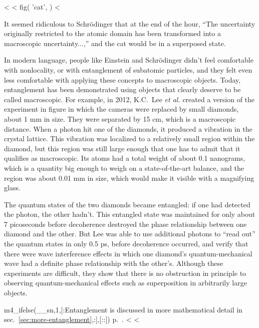 <%
<%
  fig(
    'cat',
  )
<%

\noindent It seemed ridiculous to Schr\"odinger that at the end of
the hour, ``The uncertainty originally restricted to the atomic domain
has been transformed into a macroscopic uncertainty...,'' and the cat
would be in a superposed state. 

In modern language, people like Einstein and Schr\"odinger didn't feel
comfortable with nonlocality, or with entanglement of subatomic
particles, and they felt even less comfortable with applying these
concepts to macroscopic objects. Today, entanglement has been
demonstrated using objects that clearly deserve to be called
macroscopic.\label{macroscopic-entanglement}
For example, in 2012, K.C.~Lee \emph{et al.} created a
version of the experiment in figure  in which
the cameras were replaced by small diamonds, about 1 mm in size.  They
were separated by 15 cm, which is a macroscopic distance. When a
photon hit one of the diamonds, it produced a vibration in the crystal
lattice.  This vibration was localized to a relatively small region
within the diamond, but this region was still large enough that one
has to admit that it qualifies as macroscopic. Its atoms had a total
weight of about 0.1 nanograms, which is a quantity big enough to weigh
on a state-of-the-art balance, and the region was about 0.01 mm in
size, which would make it visible with a magnifying glass. 

The quantum states of the two diamonds became entangled: if one had
detected the photon, the other hadn't. This entangled state was
maintained for only about 7 picoseconds before decoherence destroyed
the phase relationship between one diamond and the other. But Lee was
able to use additional photons to ``read out'' the quantum states in
only 0.5 ps, before decoherence occurred, and verify that there were
wave interference effects in which one diamond's quantum-mechanical
wave had a definite phase relationship with the other's.  Although
these experiments are difficult, they show that there is no
obstruction in principle to observing quantum-mechanical effects such
as superposition in arbitrarily large objects. 

m4_ifelse(__sn,1,[:Entanglement is discussed in more mathematical detail in sec.~\ref{sec:more-entanglement},:],[::])
p.~\pageref{sec:more-entanglement}.
<%
<%
